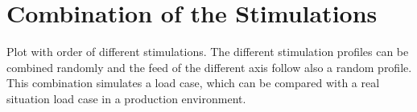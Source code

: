 \section{Combination of the Stimulations}
\label{sec:combined_stimulations}

Plot with order of different stimulations. The different stimulation profiles can be combined randomly and the feed of the different axis follow also a random profile. This combination simulates a load case, which can be compared with a real situation load case in a production environment.





 


